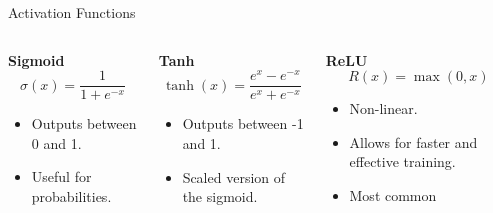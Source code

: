 \documentclass[aspectratio=169]{../latex_main/tntbeamer}  %
\begin{document}
	\begin{frame}{Activation Functions}

        \begin{columns}
            \begin{column}{0.33\textwidth}
                \textbf{Sigmoid}
                \[
                \sigma(x) = \frac{1}{1 + e^{-x}}
                \]
                \begin{itemize}
                    \item Outputs between 0 and 1.
                    \item Useful for probabilities.
                \end{itemize}
            \end{column}

         \begin{column}{0.33\textwidth}
                \textbf{Tanh}
                \[
                \tanh(x) = \frac{e^{x} - e^{-x}}{e^{x} + e^{-x}}
                \]
                \begin{itemize}
                    \item Outputs between -1 and 1.
                    \item Scaled version of the sigmoid.
                \end{itemize}
            \end{column}
            
            \begin{column}{0.33\textwidth}
                \textbf{ReLU}
                \[
                R(x) = \max(0, x)
                \]
                \begin{itemize}
                    \item Non-linear.
                    \item Allows for faster and effective training.
                    \item Most common
                \end{itemize}
            \end{column}
           
        \end{columns}
                
	\end{frame}
\end{document}
